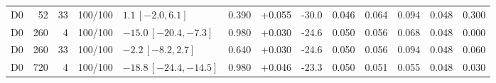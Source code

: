 \begin{longtable}{crrcp{33mm}rrrrrrrr}
D0 & 52 & 33 & 100/100 & \(1.1\,[-2.0,6.1]\) & 0.390 & +0.055 & -30.0 & 0.046 & 0.064 & 0.094 & 0.048 & 0.300\\
D0 & 260 & 4 & 100/100 & \(-15.0\,[-20.4,-7.3]\) & 0.980 & +0.030 & -24.6 & 0.050 & 0.056 & 0.068 & 0.048 & 0.000\\
D0 & 260 & 33 & 100/100 & \(-2.2\,[-8.2,2.7]\) & 0.640 & +0.030 & -24.6 & 0.050 & 0.056 & 0.094 & 0.048 & 0.060\\
D0 & 720 & 4 & 100/100 & \(-18.8\,[-24.4,-14.5]\) & 0.980 & +0.046 & -23.3 & 0.050 & 0.051 & 0.055 & 0.048 & 0.030\\

\end{longtable}
